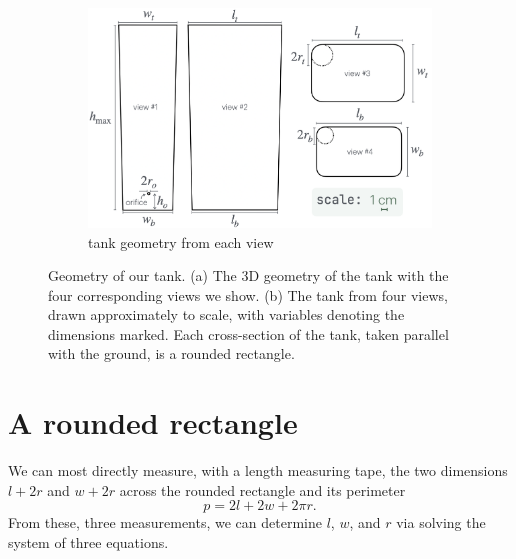\documentclass[a4paper,fleqn]{cas-sc}
\begin{document}
\begin{figure}[h!]
	\begin{subfigure}[b]{0.8\textwidth}
		\includegraphics[width=\textwidth]{../drawings_and_photos/tank_geometry.png} \caption{tank geometry from each view}
	\end{subfigure}
	\caption{Geometry of our tank. 
	(a) The 3D geometry of the tank with the four corresponding views we show. (b) The tank from four views, drawn approximately to scale, with variables denoting the dimensions marked. Each cross-section of the tank, taken parallel with the ground, is a rounded rectangle.
	} \label{fig:tank_geometry}
\end{figure}

\clearpage

\section{A rounded rectangle}
We can most directly measure, with a length measuring tape, the two dimensions $l+2r$ and $w+2r$ across the rounded rectangle and its perimeter 
\begin{equation}
p = 2 l + 2 w + 2 \pi r.
\end{equation}
From these, three measurements, we can determine $l$, $w$, and $r$ via solving the system of three equations.
\end{document}
